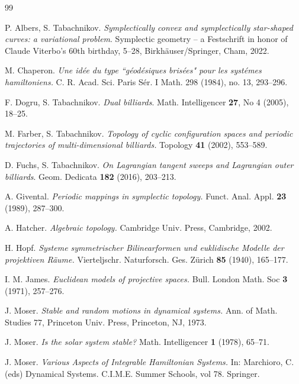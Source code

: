 \documentclass[12pt]{article}
\begin{document}
\begin{thebibliography}{99}

 P. Albers, S. Tabachnikov. {\it Symplectically convex and symplectically star-shaped curves: a variational problem}.  Symplectic geometry -- a Festschrift in honor of Claude Viterbo's 60th birthday, 5--28, Birkh\"auser/Springer, Cham, 2022.

 M. Chaperon.  {\it Une id\'ee du type ``g\'eod\'esiques bris\'ees" pour les syst\'emes hamiltoniens.}  C. R. Acad. Sci. Paris S\'er. I Math. 298 (1984), no. 13, 293--296. 

 F. Dogru, S. Tabachnikov. {\it Dual billiards}. Math. Intelligencer {\bf 27}, No 4 (2005), 18--25.

 M. Farber, S. Tabachnikov. {\it Topology of cyclic configuration spaces and periodic trajectories of multi-dimensional billiards.} Topology {\bf 41} (2002),  553--589. 

 D. Fuchs, S. Tabachnikov. {\it On  Lagrangian tangent sweeps and Lagrangian outer billiards}. Geom. Dedicata {\bf 182} (2016), 203--213.

 A. Givental. {\it Periodic mappings in symplectic topology.}  Funct. Anal. Appl. {\bf 23} (1989),  287--300. 

 A. Hatcher. {\it  Algebraic topology.} Cambridge Univ. Press, Cambridge, 2002.

 H. Hopf. {\it Systeme symmetrischer {B}ilinearformen und euklidische
              {M}odelle der projektiven {R}\"{a}ume.} Vierteljschr. Naturforsch. Ges. Zürich {\bf 85} (1940), 165--177.

 I. M. James. {\it Euclidean models of projective spaces.} Bull. London Math. Soc {\bf 3} (1971), 257--276.

 J. Moser. {\it Stable and random motions in dynamical systems.} Ann.
of Math. Studies 77, Princeton Univ. Press, Princeton, NJ, 1973.

 J. Moser. {\it Is the solar system stable?} Math. Intelligencer {\bf 1} (1978), 65--71.

 J. Moser. {\it Various Aspects of Integrable Hamiltonian Systems.} In: Marchioro, C. (eds) Dynamical Systems. C.I.M.E. Summer Schools, vol 78. Springer.



\end{thebibliography}
\end{document}
